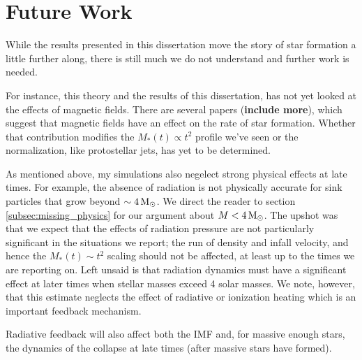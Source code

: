 \documentclass[../dissertation.tex]{subfiles}
\begin{document}
\section{Future Work}
While the results presented in this dissertation move the story of star formation a little further along, 
there is still much we do not understand and further work is needed. 

For instance, this theory and the results of this dissertation, has not yet looked at the effects of magnetic fields. 
There are several papers \citet{2017ApJ...838...40M} ({\bf include more}), which suggest that magnetic fields have an effect on the rate of star formation. 
Whether that contribution modifies the $M_*(t) \propto t^2$ profile we've seen or the normalization, like protostellar jets, has yet to be determined. 

As mentioned above, my simulations also negelect strong physical effects at late times. 
For example, the absence of radiation is not physically accurate for sink particles that grow beyond $\sim 4 {\,\rm M}_\odot$.
We direct the reader to section \ref{subsec:missing_physics} for our argument about $M < 4 {\,\rm M}_\odot$. 
The upshot was that we expect that the effects of radiation pressure are not particularly significant in the situations we report; 
the run of density and infall velocity, and hence the $M_*(t)\sim t^2$ scaling should not be affected, at least up to the times we are reporting on. 
Left unsaid is that radiation dynamics must have a significant effect at later times when stellar masses exceed 4 solar masses.
We note, however, that this estimate neglects the effect of radiative or ionization heating which is an important feedback mechanism.


Radiative feedback will also affect both the IMF and, for massive enough stars, the dynamics of the collapse at late times (after massive stars have formed). 

%
\end{document}
